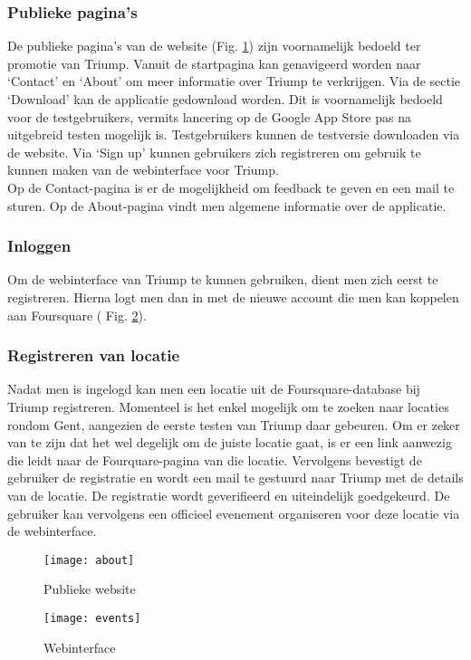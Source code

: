\subsubsection{Publieke pagina's}
De publieke pagina's van de website (Fig. \ref{fig:about}) zijn voornamelijk bedoeld ter promotie van Triump. Vanuit de startpagina kan genavigeerd worden naar `Contact' en `About' om meer informatie over Triump te verkrijgen. Via de sectie `Download' kan de applicatie gedownload worden. Dit is voornamelijk bedoeld voor de testgebruikers, vermits lancering op de Google App Store pas na uitgebreid testen mogelijk is. Testgebruikers kunnen de testversie downloaden via de website. Via `Sign up' kunnen gebruikers zich registreren om gebruik te kunnen maken van de webinterface voor Triump.\\
Op de Contact-pagina is er de mogelijkheid om feedback te geven en een mail te sturen.
Op de About-pagina vindt men algemene informatie over de applicatie.
\subsubsection{Inloggen}
Om de webinterface van Triump te kunnen gebruiken, dient men zich eerst te registreren. Hierna logt men dan in met de nieuwe account die men kan koppelen aan Foursquare ( Fig. \ref{fig:events}).
\subsubsection{Registreren van locatie}
Nadat men is ingelogd kan men een locatie uit de Foursquare-database bij Triump registreren.
Momenteel is het enkel mogelijk om te zoeken naar locaties rondom Gent, aangezien de eerste testen van Triump daar gebeuren.
Om er zeker van te zijn dat het wel degelijk om de juiste locatie gaat, is er een link aanwezig die leidt naar de Fourquare-pagina van die locatie.
Vervolgens bevestigt de gebruiker de registratie en wordt een mail te gestuurd naar Triump met de details van de locatie. De registratie wordt geverifieerd en uiteindelijk goedgekeurd.
De gebruiker kan vervolgens een officieel evenement organiseren voor deze locatie via de webinterface.
\begin{figure}[H]
	\centering
	\texttt{[image: about]}
	\caption{Publieke website }
	\label{fig:about}
\end{figure}

\begin{figure}[H]
	\centering
	\texttt{[image: events]}
	\caption{Webinterface }
	\label{fig:events}
\end{figure}



